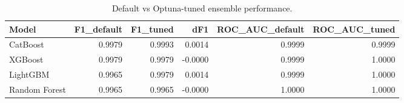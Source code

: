 \begin{table}
\caption{Default vs Optuna-tuned ensemble performance.}
\label{tab:tuningcomp}
\begin{tabular}{lrrrrr}
\toprule
Model & F1\_default & F1\_tuned & dF1 & ROC\_AUC\_default & ROC\_AUC\_tuned \\
\midrule
CatBoost & 0.9979 & 0.9993 & 0.0014 & 0.9999 & 0.9999 \\
XGBoost & 0.9979 & 0.9979 & -0.0000 & 0.9999 & 1.0000 \\
LightGBM & 0.9965 & 0.9979 & 0.0014 & 0.9999 & 1.0000 \\
Random Forest & 0.9965 & 0.9965 & -0.0000 & 1.0000 & 1.0000 \\
\bottomrule
\end{tabular}
\end{table}
